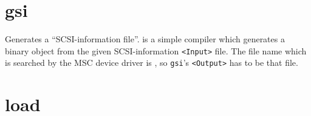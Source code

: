 \section{gsi}
\begin{man}
  \PP Generates a ``SCSI-information file''.
   is a simple compiler which generates a binary object from the
             given SCSI-information {\tt <Input>} file. The file name which is
             searched by the MSC device driver is \HESI,
             so {\tt gsi}'s {\tt <Output>} has to be that file.
\end{man}

\section{load}
